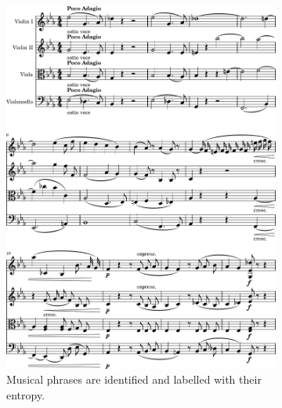 \documentclass[aps,pra,10pt,twocolumn]{revtex4-2}
\begin{document}
\begin{figure}[h]
\begin{subfigure}[b]{0.5\linewidth}
        \includegraphics[width=\subfigurewidth]{../Figures/excerpt-1.png}
        \caption{Musical phrases are identified and labelled with their entropy.}
        \label{fig:phrases}
    \end{subfigure}
    \par\bigskip
    \begin{subfigure}[b]{0.5\linewidth}

\end{subfigure}
\end{figure}
\end{document}
